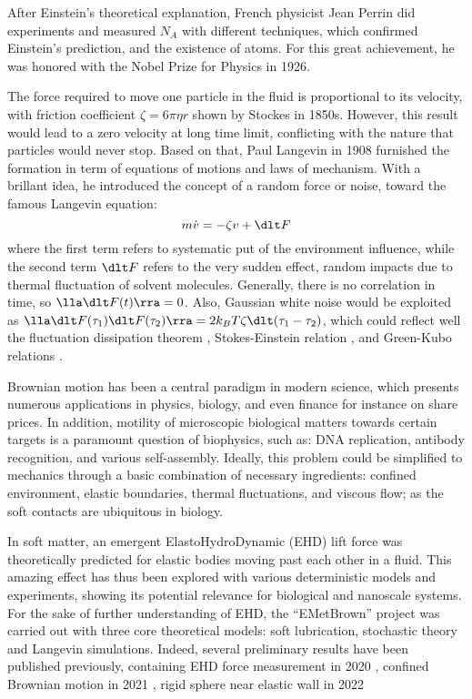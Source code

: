 \documentclass[fleqn,10pt]{InternshipReport-ENS-PSL}
\begin{document}
After Einstein's theoretical explanation, French physicist Jean Perrin did experiments and measured $N_A$ with different techniques, which confirmed Einstein's prediction, and the existence of atoms. For this great achievement, he was honored with the Nobel Prize for Physics in 1926. \cite{Perrin1910}

The force required to move one particle in the fluid is proportional to its velocity, with friction coefficient $\zeta = 6 \pi \eta r$ shown by Stockes in 1850s. However, this result would lead to a zero velocity at long time limit, conflicting with the nature that particles would never stop. Based on that, Paul Langevin in 1908 furnished the formation in term of equations of motions and laws of mechanism. With a brillant idea, he introduced the concept of a random force or noise, toward the famous Langevin equation: \cite{Langevin1908}
$$ m \dot{v} = - \zeta v + \dlt F $$
where the first term refers to systematic put of the environment influence, while the second term $\dlt F$ refers to the very sudden effect, random impacts due to thermal fluctuation of solvent molecules. Generally, there is no correlation in time, so $\lla \dlt F(t) \rra = 0$. Also, Gaussian white noise would be exploited as $\lla \dlt F(\tau_1) \dlt F(\tau_2) \rra = 2 k_B T \zeta \dlt(\tau_1 - \tau_2)$, which could reflect well the fluctuation dissipation theorem \cite{dissipation}, Stokes-Einstein relation \cite{Stokes-Ein}, and Green-Kubo relations \cite{Green-Kubo}.


Brownian motion has been a central paradigm in modern science, which presents numerous applications in physics, biology, and even finance for instance on share prices. %
In addition, motility of microscopic biological matters towards certain targets is a paramount question of biophysics, such as: DNA replication, antibody recognition, and various self-assembly. Ideally, this problem could be simplified to mechanics through a basic combination of necessary ingredients: confined environment, elastic boundaries, thermal fluctuations, and viscous flow; %
as the soft contacts are ubiquitous in biology.


In soft matter, an emergent ElastoHydroDynamic (EHD) lift force was theoretically predicted for elastic bodies moving past each other in a fluid. 
This amazing effect has thus been explored with various deterministic models and experiments, showing its potential relevance for biological and nanoscale systems. 
For the sake of further understanding of EHD, the “EMetBrown” project was carried out with three core theoretical models: soft lubrication, stochastic theory and Langevin simulations. 
Indeed, several preliminary results have been published previously, containing EHD force measurement in 2020 \cite{PRL2020}, confined Brownian motion in 2021 \cite{PRR2021,MaxPhD}, rigid sphere near elastic wall in 2022 \cite{JFM2022}
\end{document}
